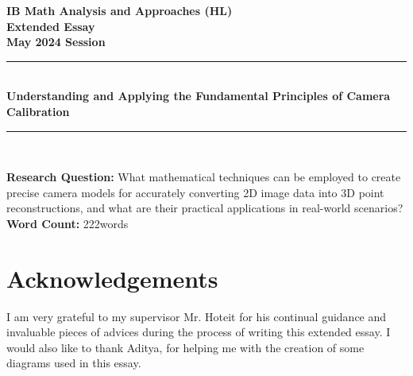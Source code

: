 \documentclass[letter, 12pt, oneside]{article}
\providecommand{\wordcount}{222}
\begin{document}
\pagestyle{normal}

\begin{titlepage}
    \large

    \begin{center}

        \vspace*{2cm}

        {\bfseries
            IB Math Analysis and Approaches (HL) \\
            Extended Essay\\
            May 2024 Session}\\

        \vspace*{\fill}

        \rule{\linewidth}{1.5pt} \\ [0.5cm]
        {\LARGE \bfseries Understanding and Applying the Fundamental Principles of Camera Calibration}
        \rule{\linewidth}{0.5pt} \\

        \vspace*{\fill}

        \textbf{Research Question:} What mathematical techniques can be employed to create precise camera models for accurately converting 2D image data into 3D point reconstructions, and what are their practical applications in real-world scenarios? \\ [1cm]

        \textbf{Word Count:} \wordcount \space words

        \vspace*{2cm}

    \end{center}

\end{titlepage}

\thispagestyle{empty}
\tableofcontents

\clearpage
{}
\setcounter{page}{1}








\section*{Acknowledgements}

I am very grateful to my supervisor Mr. Hoteit for his continual guidance and invaluable pieces of advices during the process of writing this extended essay. I would also like to thank Aditya, for helping me with the creation of some diagrams used in this essay. 

\printbibliography[heading=bibintoc]{}
\end{document}
